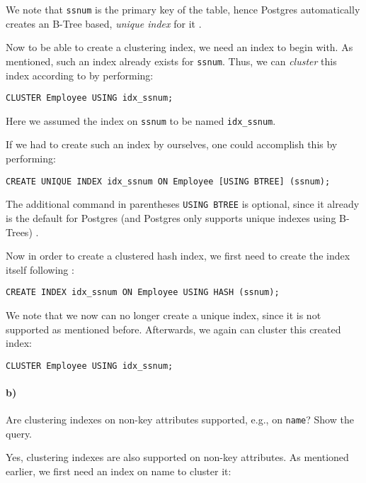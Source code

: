 \documentclass[11pt]{scrartcl}
\begin{document}
We note that \texttt{ssnum} is the primary key of the table, hence Postgres automatically creates an B-Tree based,
\textit{unique index} for it \cite{PostgreSQL2024Unique}.

Now to be able to create a clustering index, we need an index to begin with.
As mentioned, such an index already exists for \texttt{ssnum}.
Thus, we can \textit{cluster} this index according to \cite{PostgreSQL2024Cluster} by performing:

\begin{lstlisting}[style=dbtsql]
CLUSTER Employee USING idx_ssnum;
\end{lstlisting}

Here we assumed the index on \texttt{ssnum} to be named \texttt{idx\_ssnum}.

If we had to create such an index by ourselves, one could accomplish this by performing:
\begin{lstlisting}[style=dbtsql]
CREATE UNIQUE INDEX idx_ssnum ON Employee [USING BTREE] (ssnum);
\end{lstlisting}

The additional command in parentheses \texttt{USING BTREE} is optional, since it already is the default for Postgres
(and Postgres only supports unique indexes using B-Trees) \cite{PostgreSQL2024Unique}.

Now in order to create a clustered hash index, we first need to create the index itself following
\cite{PostgreSQL2024IndexTypes}:

\begin{lstlisting}[style=dbtsql]
CREATE INDEX idx_ssnum ON Employee USING HASH (ssnum);
\end{lstlisting}

We note that we now can no longer create a unique index, since it is not supported as mentioned before.
Afterwards, we again can cluster this created index:

\begin{lstlisting}[style=dbtsql]
CLUSTER Employee USING idx_ssnum;
\end{lstlisting}

\paragraph{b)}

Are clustering indexes on non-key attributes supported, e.g., on \texttt{name}? Show the query.

Yes, clustering indexes are also supported on non-key attributes.
As mentioned earlier, we first need an index on name to cluster it:
\end{document}

